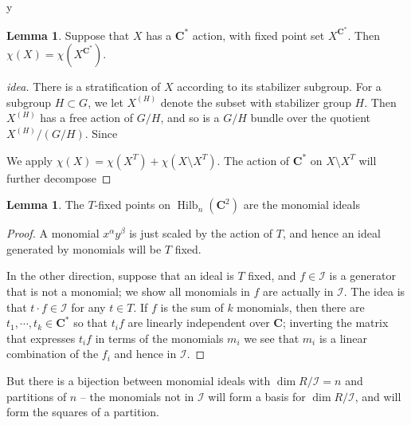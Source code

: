 y\documentclass{amsart}[12pt]
\theoremstyle{definition}
\newtheorem{lemma}[dummy]{Lemma}
\newcommand{\C}{\mathbf{C}}
\DeclareMathOperator{\Hilb}{Hilb}
\begin{document}
\begin{lemma}
Suppose that $X$ has a $\C^*$ action, with fixed point set $X^{\C^*}$.  Then $\chi(X)=\chi(X^{\C^*})$.
\end{lemma}

\begin{proof}[idea]
There is a stratification of $X$ according to its stabilizer subgroup.  For a subgroup $H\subset G$, we let $X^{(H)}$ denote the subset with stabilizer group $H$.  Then $X^{(H)}$ has a free action of $G/H$, and so is a $G/H$ bundle over the quotient $X^{(H)}/(G/H)$.  Since 

We apply $\chi(X)=\chi(X^T)+\chi(X\setminus X^T)$.  The action of $\C^*$ on $X\setminus X^T$ will further decompose
\end{proof}


\begin{lemma}
The $T$-fixed points on $\Hilb_n(\C^2)$ are the monomial ideals
\end{lemma}

\begin{proof}
A monomial $x^\alpha y^\beta$ is just scaled by the action of $T$, and hence an ideal generated by monomials will be $T$ fixed.  

In the other direction, suppose that an ideal is $T$ fixed, and $f\in\mathcal{I}$ is a generator that is not a monomial; we show all monomials in $f$ are actually in $\mathcal{I}$.  The idea is that $t\cdot f\in\mathcal{I}$ for any $t\in T$.  If $f$ is the sum of $k$ monomials, then there are $t_1,\cdots, t_k\in\C^*$ so that $t_i f$ are linearly independent over $\C$; inverting the matrix that expresses $t_i f$ in terms of the monomials $m_i$ we see that $m_i$ is a linear combination of the $f_i$ and hence in $\mathcal{I}$.
\end{proof}

But there is a bijection between monomial ideals with $\dim R/\mathcal{I}=n$ and partitions of $n$ -- the monomials not in $\mathcal{I}$ will form a basis for $\dim R/\mathcal{I}$, and will form the squares of a partition.

\begin{center}
\end{center}
\end{document}
